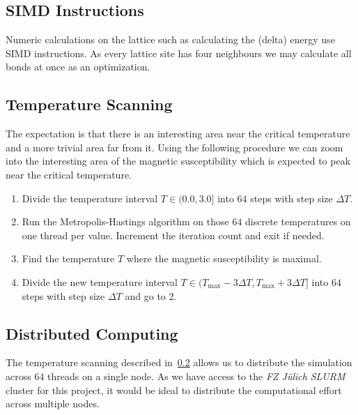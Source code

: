 \subsection{SIMD Instructions}
Numeric calculations on the lattice such as calculating the (delta) energy use SIMD instructions. As every lattice site has four neighbours we may calculate all bonds at once as an optimization.

\subsection{Temperature Scanning}\label{sec:temperature_scanning}
The expectation is that there is an interesting area near the critical temperature and a more trivial area far from it. Using the following procedure we can zoom into the interesting area of the magnetic susceptibility which is expected to peak near the critical temperature.
\begin{enumerate}
	\item Divide the temperature interval $T \in (0.0, 3.0]$ into $64$ steps with step size $\Delta T$.
	\item Run the Metropolis-Hastings algorithm on those $64$ discrete temperatures on one thread per value. Increment the iteration count and exit if needed.
	\item Find the temperature $T$ where the magnetic susceptibility is maximal.
	\item Divide the new temperature interval $T \in (T_\text{max} - 3\Delta T, T_\text{max} + 3\Delta T]$ into $64$ steps with step size $\Delta T$ and go to 2.
\end{enumerate}


\subsection{Distributed Computing}\label{sec:distributed_computing}
The temperature scanning described in~\cref{sec:temperature_scanning} allows us to distribute the simulation across $64$ threads on a single node. As we have access to the \emph{FZ Jülich} \emph{SLURM} cluster for this project, it would be ideal to distribute the computational effort across multiple nodes.

